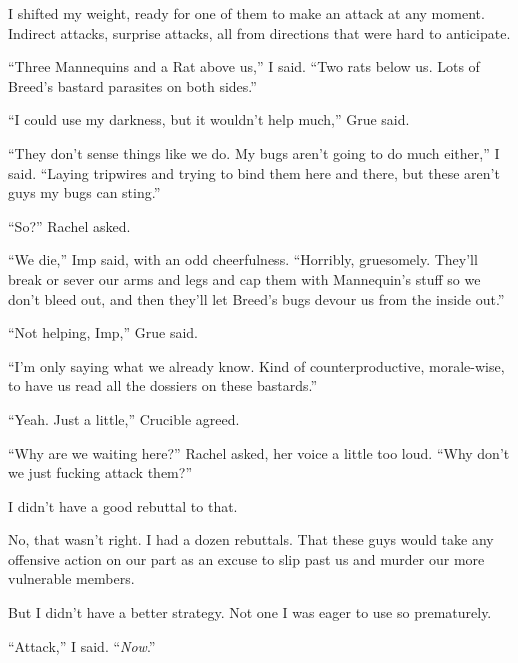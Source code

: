 I shifted my weight, ready for one of them to make an attack at any moment.  Indirect attacks, surprise attacks, all from directions that were hard to anticipate.



``Three Mannequins and a Rat above us,'' I said.  ``Two rats below us.  Lots of Breed's bastard parasites on both sides.''



``I could use my darkness, but it wouldn't help much,'' Grue said.



``They don't sense things like we do.  My bugs aren't going to do much either,'' I said.  ``Laying tripwires and trying to bind them here and there, but these aren't guys my bugs can sting.''



``So?'' Rachel asked.



``We die,'' Imp said, with an odd cheerfulness.  ``Horribly, gruesomely.  They'll break or sever our arms and legs and cap them with Mannequin's stuff so we don't bleed out, and then they'll let Breed's bugs devour us from the inside out.''



``Not helping, Imp,'' Grue said.



``I'm only saying what we already know.  Kind of counterproductive, morale-wise, to have us read all the dossiers on these bastards.''



``Yeah.  Just a little,'' Crucible agreed.



``Why are we waiting here?'' Rachel asked, her voice a little too loud.  ``Why don't we just fucking attack them?''



I didn't have a good rebuttal to that.



No, that wasn't right.  I had a dozen rebuttals.  That these guys would take any offensive action on our part as an excuse to slip past us and murder our more vulnerable members.



But I didn't have a better strategy.  Not one I was eager to use so prematurely.



``Attack,'' I said.  ``\emph{Now}.''



